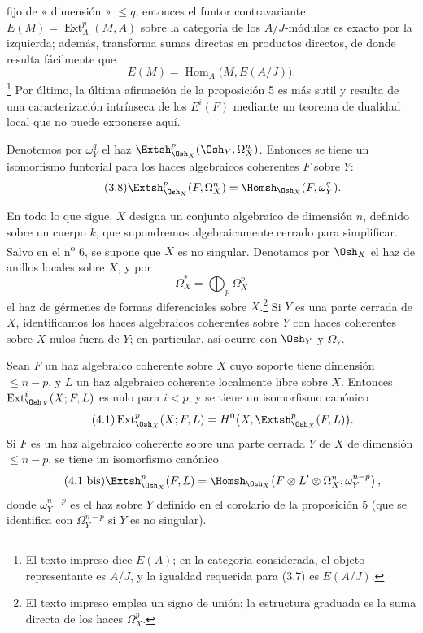 fijo de « dimensión » $\leq q$, entonces el funtor contravariante
$E(M)=\operatorname{Ext}_{A}^{p}(M,A)$ sobre la categoría de los $A/J$-módulos es
exacto por la izquierda; además, transforma sumas directas en productos directos,
de donde resulta fácilmente que
\[
  E(M)=\operatorname{Hom}_{A}\bigl(M,E(A/J)\bigr).
\]
\footnote{El texto impreso dice $E(A)$; en la categoría considerada, el objeto
representante es $A/J$, y la igualdad requerida para (3.7) es $E(A/J)$.} Por último, la
última afirmación de la proposición 5 es más sutil y resulta de una
caracterización intrínseca de los $E^{i}(F)$ mediante un teorema de dualidad
local que no puede exponerse aquí.

 Denotemos por $\omega_Y^{q}$ el haz
$\Extsh_{\Osh_X}^{p}(\Osh_Y,\Omega_X^{n})$. Entonces se tiene un isomorfismo
funtorial para los haces algebraicos coherentes $F$ sobre $Y$:
\begin{equation}\tag{3.8}
  \Extsh_{\Osh_X}^{p}(F,\Omega_X^{n})
  =\Homsh_{\Osh_X}(F,\omega_Y^{q}).
\end{equation}


En todo lo que sigue, $X$ designa un conjunto algebraico de dimensión $n$, definido
sobre un cuerpo $k$, que supondremos algebraicamente cerrado para simplificar. Salvo
en el n\textsuperscript{o} 6, se supone que $X$ es no singular. Denotamos por
$\Osh_X$ el haz de anillos locales sobre $X$, y por
\[
  \Omega_X^{*}=\bigoplus_p\Omega_X^{p}
\]
el haz de gérmenes de formas diferenciales sobre $X$.\footnote{El texto
impreso emplea un signo de unión; la estructura graduada es la suma directa
de los haces $\Omega_X^p$.} Si $Y$ es una parte cerrada de $X$, identificamos
los haces algebraicos coherentes sobre $Y$ con haces coherentes sobre $X$
nulos fuera de $Y$; en particular, así ocurre con $\Osh_Y$ y $\Omega_Y$.

 Sean $F$ un haz algebraico coherente sobre $X$ cuyo
soporte tiene dimensión $\leq n-p$, y $L$ un haz algebraico coherente
localmente libre sobre $X$. Entonces $\operatorname{Ext}_{\Osh_X}^{i}(X;F,L)$ es nulo
para $i<p$, y se tiene un isomorfismo canónico
\begin{equation}\tag{4.1}
  \operatorname{Ext}_{\Osh_X}^{p}(X;F,L)
  =H^{0}\bigl(X,\Extsh_{\Osh_X}^{p}(F,L)\bigr).
\end{equation}
Si $F$ es un haz algebraico coherente sobre una parte cerrada $Y$ de $X$ de
dimensión $\leq n-p$, se tiene un isomorfismo canónico
\begin{equation}\tag{4.1 bis}
  \Extsh_{\Osh_X}^{p}(F,L)
  =\Homsh_{\Osh_X}\!\left(
    F\otimes L'\otimes\Omega_X^{n},\omega_Y^{n-p}
  \right),
\end{equation}
donde $\omega_Y^{n-p}$ es el haz sobre $Y$ definido en el corolario de la
proposición 5 (que se identifica con $\Omega_Y^{n-p}$ si $Y$ es no singular).

